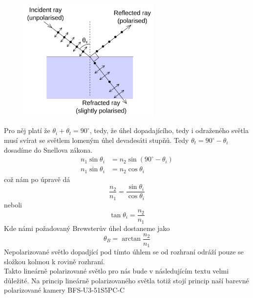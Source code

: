 \documentclass[a4paper]{article}
\numberwithin{equation}{section}
\begin{document}
    \begin{figure}[ht]
        \includegraphics[width=7cm]{figures/Brewster.png}
        \centering
    \end{figure}
    \par Pro něj platí že $\theta_i + \theta_t = 90^{\circ}$, tedy, že úhel dopadajícího, tedy i odraženého světla musí svírat se světlem lomeným úhel devadesáti stupňů. Tedy $\theta_t = 90^{\circ} - \theta_i$ dosadíme do Snellova zákona. 
    \begin{equation}
        \!
        \begin{aligned}
            n_1 \sin \theta_i &= n_2 \sin (90^{\circ} - \theta_i) \\
            n_1 \sin \theta_i &= n_2 \cos \theta_i
        \end{aligned}
    \end{equation} 
    což nám po úpravě dá 
    \begin{equation}
        \frac{n_2}{n_1} = \frac{\sin \theta_i}{\cos \theta_i}
    \end{equation}
    neboli
    \begin{equation}
        \tan \theta_i = \frac{n_2}{n_1}
    \end{equation}
    Kde námi požadovaný Brewsterův úhel dostaneme jako
    \begin{equation}
        \theta_B = \arctan \frac{n_2}{n_1}
    \end{equation}
    Nepolarizované světlo dopadjící pod tímto úhlem se od rozhraní odráží pouze se složkou kolmou k rovině rozhraní. \cite{hecht} 
    \\Takto lineárně polarizované světlo pro nás bude v následujícím textu velmi důležité. Na princip lineárně polarizovaného světla totiž stojí princip naší barevné polarizované kamery BFS-U3-51S5PC-C

    \newpage
\end{document}
